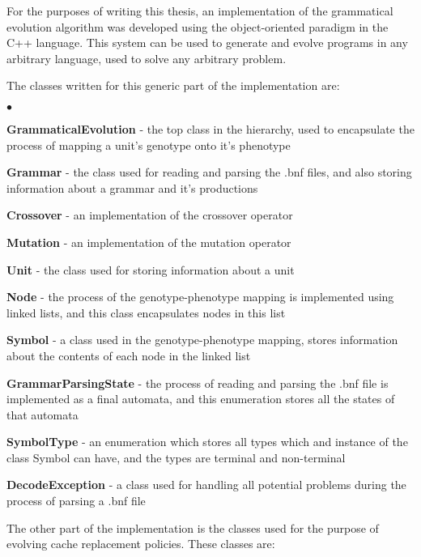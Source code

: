 For the purposes of writing this thesis, an implementation of the grammatical evolution algorithm was developed using the object-oriented paradigm in the C++ language. This system can be used to generate and evolve programs in any arbitrary language, used to solve any arbitrary problem.

The classes written for this generic part of the implementation are:

\begin{list}{$\bullet$}{}  	
	\item \textbf{GrammaticalEvolution} - the top class in the hierarchy, used to encapsulate the process of mapping a unit's genotype onto it's phenotype
	\item \textbf{Grammar} - the class used for reading and parsing the .bnf files, and also storing information about a grammar and it's productions 
	\item \textbf{Crossover} - an implementation of the crossover operator
	\item \textbf{Mutation} - an implementation of the mutation operator
	\item \textbf{Unit} - the class used for storing information about a unit
	\item \textbf{Node} - the process of the genotype-phenotype mapping is implemented using linked lists, and this class encapsulates nodes in this list
	\item \textbf{Symbol} - a class used in the genotype-phenotype mapping, stores information about the contents of each node in the linked list
	\item \textbf{GrammarParsingState} - the process of reading and parsing the .bnf file is implemented as a final automata, and this enumeration stores all the states of that automata
	\item \textbf{SymbolType} - an enumeration which stores all types which and instance of the class Symbol can have, and the types are terminal and non-terminal
	\item \textbf{DecodeException} - a class used for handling all potential problems during the process of parsing a .bnf file
\end{list}

The other part of the implementation is the classes used for the purpose of evolving cache replacement policies. These classes are:

